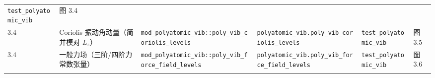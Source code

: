 \documentclass[
]{ctexbook}
\begin{document}
\begin{longtable}[]{@{}llllll@{}}
\begin{minipage}[t]{0.14\columnwidth}
\texttt{test\_polyatomic\_vib}\strut
\end{minipage} & \begin{minipage}[t]{0.14\columnwidth}\raggedright
图 3.4\strut
\end{minipage}\tabularnewline
\begin{minipage}[t]{0.14\columnwidth}\raggedright
3.4\strut
\end{minipage} & \begin{minipage}[t]{0.14\columnwidth}\raggedright
Coriolis 振动角动量（简并模对 \(L_z\)）\strut
\end{minipage} & \begin{minipage}[t]{0.14\columnwidth}\raggedright
\texttt{mod\_polyatomic\_vib::poly\_vib\_coriolis\_levels}\strut
\end{minipage} & \begin{minipage}[t]{0.14\columnwidth}\raggedright
\texttt{polyatomic\_vib.poly\_vib\_coriolis\_levels}\strut
\end{minipage} & \begin{minipage}[t]{0.14\columnwidth}\raggedright
\texttt{test\_polyatomic\_vib}\strut
\end{minipage} & \begin{minipage}[t]{0.14\columnwidth}\raggedright
图 3.5\strut
\end{minipage}\tabularnewline
\begin{minipage}[t]{0.14\columnwidth}\raggedright
3.4\strut
\end{minipage} & \begin{minipage}[t]{0.14\columnwidth}\raggedright
一般力场（三阶/四阶力常数张量）\strut
\end{minipage} & \begin{minipage}[t]{0.14\columnwidth}\raggedright
\texttt{mod\_polyatomic\_vib::poly\_vib\_force\_field\_levels}\strut
\end{minipage} & \begin{minipage}[t]{0.14\columnwidth}\raggedright
\texttt{polyatomic\_vib.poly\_vib\_force\_field\_levels}\strut
\end{minipage} & \begin{minipage}[t]{0.14\columnwidth}\raggedright
\texttt{test\_polyatomic\_vib}\strut
\end{minipage} & \begin{minipage}[t]{0.14\columnwidth}\raggedright
图 3.6\strut
\end{minipage}\tabularnewline
\begin{minipage}[t]{0.14\columnwidth}\raggedright

\end{minipage}
\end{longtable}
\end{document}
